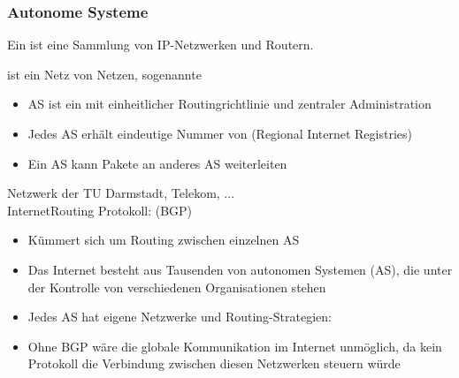 \subsubsection*{Autonome Systeme}
\begin{infoBox}
    Ein  ist eine Sammlung von IP-Netzwerken und Routern.
\end{infoBox}
 ist ein Netz von Netzen, sogenannte 
\begin{itemize}
    \item AS ist ein  mit einheitlicher Routingrichtlinie und zentraler Administration
    \item Jedes AS erhält eindeutige Nummer von  (Regional Internet Registries)
    \item Ein AS kann Pakete an anderes AS weiterleiten
\end{itemize}
 Netzwerk der TU Darmstadt, Telekom, ...\\
InternetRouting Protokoll:  (BGP)
\begin{itemize}
    \item Kümmert sich um Routing zwischen einzelnen AS
\end{itemize}
\begin{infoBox}[title=Warum ist BGP wichtig?]
    \begin{itemize}
        \item Das Internet besteht aus Tausenden von autonomen Systemen (AS), die unter der Kontrolle von verschiedenen Organisationen stehen
        \item Jedes AS hat eigene Netzwerke und Routing-Strategien: 
        \item Ohne BGP wäre die globale Kommunikation im Internet unmöglich, da kein Protokoll die Verbindung zwischen diesen Netzwerken steuern würde
    \end{itemize}
\end{infoBox}
